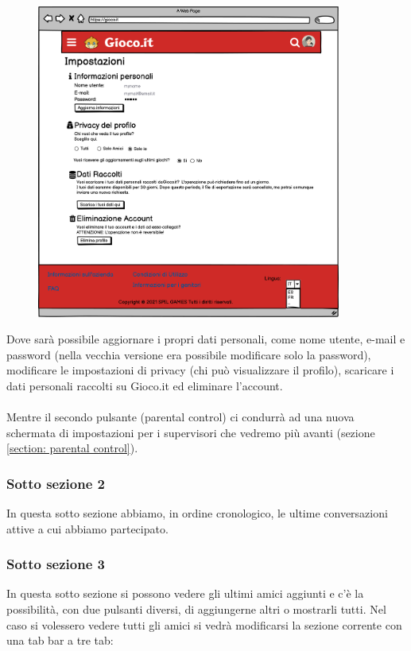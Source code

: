 \documentclass[../Report.tex]{subfiles}
\begin{document}
    \begin{figure}[H]
        \includegraphics[width=10cm]{WImpostazioni.png}
        \centering
    \end{figure}
    Dove sarà possibile aggiornare i propri dati personali, come nome utente, e-mail e password (nella vecchia versione era possibile modificare solo la password), modificare le impostazioni di privacy (chi può visualizzare il profilo), scaricare i dati personali raccolti su Gioco.it ed eliminare l'account.\\
    \\
    Mentre il secondo pulsante (parental control) ci condurrà ad una nuova schermata di impostazioni per i supervisori che vedremo più avanti (sezione \ref{section: parental control}).


    \subsubsection{Sotto sezione 2}
    In questa sotto sezione abbiamo, in ordine cronologico, le ultime conversazioni attive a cui abbiamo partecipato.

    \subsubsection{Sotto sezione 3}
    In questa sotto sezione si possono vedere gli ultimi amici aggiunti e c'è la possibilità, con due pulsanti diversi, di aggiungerne altri o mostrarli tutti.
    Nel caso si volessero vedere tutti gli amici si vedrà modificarsi la sezione corrente con una tab bar a tre tab:
    
\end{document}
